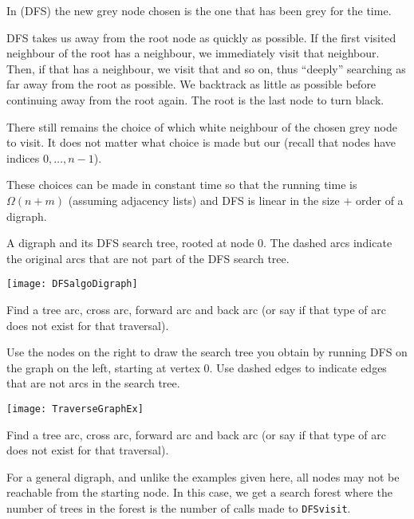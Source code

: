 \begin{Definition}
In  (DFS) the new grey node chosen is the one
that has been grey for the  time.
\end{Definition}

DFS takes us away from the root node as quickly as possible. 
If the first visited neighbour of the root has a neighbour, we immediately visit that neighbour. 
Then, if that has a neighbour, we visit that and so on, thus ``deeply'' searching as far away from the root as possible. 
We backtrack as little as possible before continuing away from the root again. The root is the last node to turn black.

There still remains the choice of which white neighbour of the chosen grey node to visit. 
It does not matter what choice is made but our  (recall that nodes have indices $0, \dots, n - 1$). 

These choices can be made in constant time so that the running time is  $\Omega(n + m)$ (assuming adjacency lists) 
and DFS is linear in the size $+$ order of a digraph. 

\begin{Boxample}[2]
A digraph and its DFS search tree, rooted at node $0$. The dashed arcs indicate the original arcs that are not part of the DFS search tree.
\begin{center}
  \texttt{[image: DFSalgoDigraph]}
\end{center}
Find a tree arc, cross arc, forward arc and back arc (or say if that type of arc does not exist for that traversal).
\end{Boxample}

\begin{Boxample}[2]
Use the nodes on the right to draw the search tree you obtain by running DFS on the graph on the left, starting at vertex $0$. 
Use dashed edges to indicate edges that are not arcs in the search tree.
\begin{center}
  \texttt{[image: TraverseGraphEx]} 
\end{center}
Find a tree arc, cross arc, forward arc and back arc (or say if that type of arc does not exist for that traversal).
\end{Boxample}

For a general digraph, and unlike the examples given here, all nodes may not be reachable from the starting node. 
In this case, we get a search forest where the number of trees in the forest is the number of calls made to \texttt{DFSvisit}.

